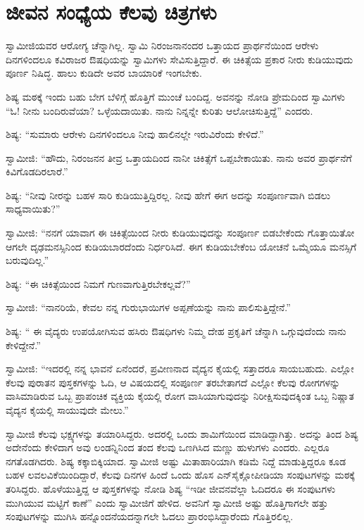
\chapter{ಜೀವನ ಸಂಧ್ಯೆಯ ಕೆಲವು ಚಿತ್ರಗಳು }

 ಸ್ವಾಮೀಜಿಯವರ ಆರೋಗ್ಯ ಚೆನ್ನಾಗಿಲ್ಲ. ಸ್ವಾಮಿ ನಿರಂಜನಾನಂದರ ಒತ್ತಾಯದ ಪ್ರಾರ್ಥನೆಯಿಂದ ಆರೇಳು ದಿನಗಳಿಂದಲೂ ಕವಿರಾಜರ ಔಷಧಿಯನ್ನು ಸ್ವಾಮಿಗಳು ಸೇವಿಸುತ್ತಿದ್ದಾರೆ. ಈ ಚಿಕಿತ್ಸೆಯ ಪ್ರಕಾರ ನೀರು ಕುಡಿಯುವುದು ಪೂರ್ಣ ನಿಷಿದ್ಧ. ಹಾಲು ಕುಡಿದೇ ಅವರ ಬಾಯಾರಿಕೆ ಇಂಗಬೇಕು. 

 ಶಿಷ್ಯ ಮಠಕ್ಕೆ ಇಂದು ಬಹು ಬೇಗ ಬೆಳಿಗ್ಗೆ ಹೊತ್ತಿಗೆ ಮುಂಚೆ ಬಂದಿದ್ದ. ಅವನನ್ನು ನೋಡಿ ಪ್ರೇಮದಿಂದ ಸ್ವಾಮಿಗಳು “ಓ!‌ ನೀನು ಬಂದಿರುವೆಯಾ? ಒಳ್ಳೆಯದಾಯಿತು. ನಾನು ನಿನ್ನನ್ನೇ ಕುರಿತು ಆಲೋಚಿಸುತ್ತಿದ್ದೆ” ಎಂದರು. 

 ಶಿಷ್ಯ: “ಸುಮಾರು ಆರೇಳು ದಿನಗಳಿಂದಲೂ ನೀವು ಹಾಲಿನಲ್ಲೇ ಇರುವಿರೆಂದು ಕೇಳಿದೆ.” 

 ಸ್ವಾಮೀಜಿ: “ಹೌದು, ನಿರಂಜನನ ತೀವ್ರ ಒತ್ತಾಯದಿಂದ ನಾನೀ ಚಿಕಿತ್ಸೆಗೆ ಒಪ್ಪಬೇಕಾಯಿತು. ನಾನು ಅವರ ಪ್ರಾರ್ಥನೆಗೆ ಕಿವಿಗೊಡದಿರಲಾರೆ.” 

 ಶಿಷ್ಯ: “ನೀವು ನೀರನ್ನು ಬಹಳ ಸಾರಿ ಕುಡಿಯುತ್ತಿದ್ದಿರಲ್ಲ. ನೀವು ಹೇಗೆ ಈಗ ಅದನ್ನು ಸಂಪೂರ್ಣವಾಗಿ ಬಿಡಲು ಸಾಧ್ಯವಾಯಿತು?” 

 ಸ್ವಾಮೀಜಿ: “ನನಗೆ ಯಾವಾಗ ಈ ಚಿಕಿತ್ಸೆಯಿಂದ ನೀರು ಕುಡಿಯುವುದನ್ನು ಸಂಪೂರ್ಣ ಬಿಡಬೇಕೆಂದು ಗೊತ್ತಾಯಿತೋ ಆಗಲೇ ದೃಢಮನಸ್ಸಿನಿಂದ ಕುಡಿಯಬಾರದೆಂದು ನಿರ್ಧರಿಸಿದೆ. ಈಗ ಕುಡಿಯಬೇಕೆಂಬ ಯೋಚನೆ ಒಮ್ಮೆಯೂ ಮನಸ್ಸಿಗೆ ಬರುವುದಿಲ್ಲ.” 

 ಶಿಷ್ಯ: “ಈ ಚಿಕಿತ್ಸೆಯಿಂದ ನಿಮಗೆ ಗುಣವಾಗುತ್ತಿರಬೇಕಲ್ಲವೆ?” 

 ಸ್ವಾಮೀಜಿ: “ನಾನರಿಯೆ, ಕೇವಲ ನನ್ನ ಗುರುಭಾಯಿಗಳ ಅಪ್ಪಣೆಯನ್ನು ನಾನು ಪಾಲಿಸುತ್ತಿದ್ದೇನೆ.” 

 ಶಿಷ್ಯ: “ ಈ ವೈದ್ಯರು ಉಪಯೋಗಿಸುವ ಹಸಿರು ಔಷಧಿಗಳು ನಿಮ್ಮ ದೇಹ ಪ್ರಕೃತಿಗೆ ಚೆನ್ನಾಗಿ ಒಗ್ಗುವುದೆಂದು ನಾನು ಕೇಳಿದ್ದೇನೆ.” 

 ಸ್ವಾಮೀಜಿ: “ಇದರಲ್ಲಿ ನನ್ನ ಭಾವನೆ ಏನೆಂದರೆ, ಪ್ರವೀಣನಾದ ವೈದ್ಯನ ಕೈಯಲ್ಲಿ ಸತ್ತಾದರೂ ಸಾಯಬಹುದು. ಎಲ್ಲೋ ಕೆಲವು ಪುರಾತನ ಪುಸ್ತಕಗಳನ್ನು ಓದಿ, ಆ ವಿಷಯದಲ್ಲಿ ಸಂಪೂರ್ಣ ತರಬೇತಾಗದೆ ಎಲ್ಲೋ ಕೆಲವು ರೋಗಗಳನ್ನು ವಾಸಿಮಾಡಿರುವ ಒಬ್ಬ ಪ್ರಾಪಂಚಿಕ ವ್ಯಕ್ತಿಯ ಕೈಯಲ್ಲಿ ರೋಗ ವಾಸಿಯಾಗುವುದನ್ನು ನಿರೀಕ್ಷಿಸುವುದಕ್ಕಿಂತ ಒಬ್ಬ ನಿಷ್ಣಾತ ವೈದ್ಯನ ಕೈಯಲ್ಲಿ ಸಾಯುವುದೇ ಮೇಲು.” 

 ಸ್ವಾಮೀಜಿ ಕೆಲವು ಭಕ್ಷ್ಯಗಳನ್ನು ತಯಾರಿಸಿದ್ದರು. ಅದರಲ್ಲಿ ಒಂದು ಶಾಮಿಗೆಯಿಂದ ಮಾಡಿದ್ದಾಗಿತ್ತು. ಅದನ್ನು ತಿಂದ ಶಿಷ್ಯ ಅದೇನೆಂದು ಕೇಳಿದಾಗ ಅವು ಲಂಡನ್ನಿನಿಂದ ತಂದ ಕೆಲವು ಒಣಗಿಸಿದ ಮಣ್ಣು ಹುಳುಗಳು ಎಂದರು. ಎಲ್ಲರೂ ನಗತೊಡಗಿದರು. ಶಿಷ್ಯ ಕಕ್ಕಾಬಿಕ್ಕಿಯಾದ. ಸ್ವಾಮೀಜಿ ಅಷ್ಟು ಮಿತಾಹಾರಿಯಾಗಿ ಕಡಿಮೆ ನಿದ್ದೆ ಮಾಡುತ್ತಿದ್ದರೂ ಕೂಡ ಬಹಳ ಲವಲವಿಕೆಯಿಂದಿದ್ದಾರೆ, ಕೆಲವು ದಿನಗಳ ಹಿಂದೆ ಒಂದು ಹೊಸ ಎನ್‌ಸೈಕ್ಲೋಪೀಡಿಯಾ ಸಂಪುಟಗಳನ್ನು ಮಠಕ್ಕೆ ತರಿಸಿದ್ದರು. ಹೊಳೆಯುತ್ತಿದ್ದ ಆ ಪುಸ್ತಕಗಳನ್ನು ನೋಡಿ ಶಿಷ್ಯ “ಇಡೀ ಜೀವನವೆಲ್ಲಾ ಓದಿದರೂ ಈ ಸಂಪುಟಗಳು ಮುಗಿಯುವ ಮಟ್ಟಿಗೆ ಕಾಣೆ” ಎಂದು ಸ್ವಾಮೀಜಿಗೆ ಹೇಳಿದ. ಅವನಿಗೆ ಸ್ವಾಮೀಜಿ ಅಷ್ಟು ಹೊತ್ತಿಗಾಗಲೇ ಹತ್ತು ಸಂಪುಟಗಳನ್ನು ಮುಗಿಸಿ ಹನ್ನೊಂದನೆಯದನ್ನಾಗಲೇ ಓದಲು ಪ್ರಾರಂಭಿಸಿದ್ದಾರೆಂದು ಗೊತ್ತಿರಲಿಲ್ಲ. 

